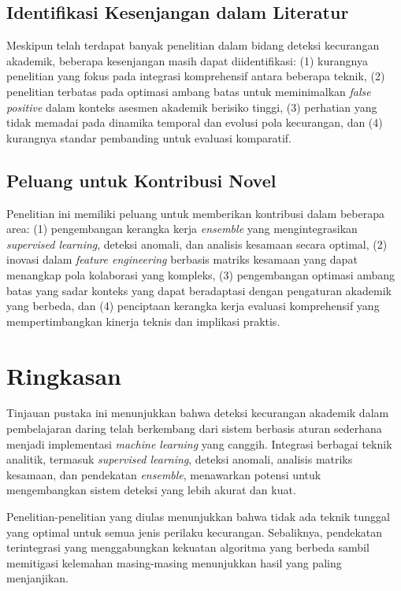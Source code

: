 \subsection{Identifikasi Kesenjangan dalam Literatur}

Meskipun telah terdapat banyak penelitian dalam bidang deteksi kecurangan akademik, beberapa kesenjangan masih dapat diidentifikasi: (1) kurangnya penelitian yang fokus pada integrasi komprehensif antara beberapa teknik, (2) penelitian terbatas pada optimasi ambang batas untuk meminimalkan \textit{false positive} dalam konteks asesmen akademik berisiko tinggi, (3) perhatian yang tidak memadai pada dinamika temporal dan evolusi pola kecurangan, dan (4) kurangnya standar pembanding untuk evaluasi komparatif.

\subsection{Peluang untuk Kontribusi Novel}

Penelitian ini memiliki peluang untuk memberikan kontribusi dalam beberapa area: (1) pengembangan kerangka kerja \textit{ensemble} yang mengintegrasikan \textit{supervised learning}, deteksi anomali, dan analisis kesamaan secara optimal, (2) inovasi dalam \textit{feature engineering} berbasis matriks kesamaan yang dapat menangkap pola kolaborasi yang kompleks, (3) pengembangan optimasi ambang batas yang sadar konteks yang dapat beradaptasi dengan pengaturan akademik yang berbeda, dan (4) penciptaan kerangka kerja evaluasi komprehensif yang mempertimbangkan kinerja teknis dan implikasi praktis.

\section{Ringkasan}
\label{sec:ringkasanBab2}

Tinjauan pustaka ini menunjukkan bahwa deteksi kecurangan akademik dalam pembelajaran daring telah berkembang dari sistem berbasis aturan sederhana menjadi implementasi \textit{machine learning} yang canggih. Integrasi berbagai teknik analitik, termasuk \textit{supervised learning}, deteksi anomali, analisis matriks kesamaan, dan pendekatan \textit{ensemble}, menawarkan potensi untuk mengembangkan sistem deteksi yang lebih akurat dan kuat.

Penelitian-penelitian yang diulas menunjukkan bahwa tidak ada teknik tunggal yang optimal untuk semua jenis perilaku kecurangan. Sebaliknya, pendekatan terintegrasi yang menggabungkan kekuatan algoritma yang berbeda sambil memitigasi kelemahan masing-masing menunjukkan hasil yang paling menjanjikan.


